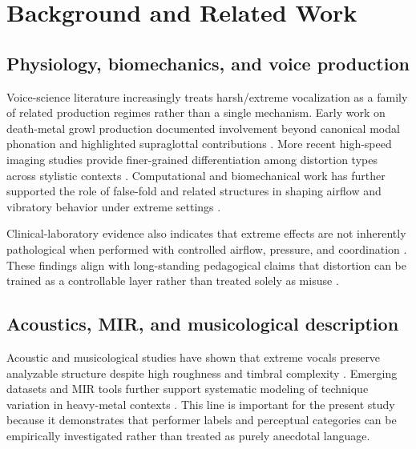 \documentclass{article}
\begin{document}
\section{Background and Related Work}
\subsection{Physiology, biomechanics, and voice production}
Voice-science literature increasingly treats harsh/extreme vocalization as a family of related production regimes rather than a single mechanism.
Early work on death-metal growl production documented involvement beyond canonical modal phonation and highlighted supraglottal contributions \parencite{Eckers2009Growling}.
More recent high-speed imaging studies provide finer-grained differentiation among distortion types across stylistic contexts \parencite{Lee2025VocalDistortion}.
Computational and biomechanical work has further supported the role of false-fold and related structures in shaping airflow and vibratory behavior under extreme settings \parencite{Zheng2009FalseVocalFolds}.

Clinical-laboratory evidence also indicates that extreme effects are not inherently pathological when performed with controlled airflow, pressure, and coordination \parencite{Aaen2024ExtremeVocalEffects,Guzman2018MetalSinging}.
These findings align with long-standing pedagogical claims that distortion can be trained as a controllable layer rather than treated solely as misuse \parencite{sadolin1996rough,sadolin2000complete,sadolin2012effects}.

\subsection{Acoustics, MIR, and musicological description}
Acoustic and musicological studies have shown that extreme vocals preserve analyzable structure despite high roughness and timbral complexity \parencite{Smialek2012Spectrographic,smialek2012musical,Tailleur2021AcousticSpace}.
Emerging datasets and MIR tools further support systematic modeling of technique variation in heavy-metal contexts \parencite{tailleur2024emvddatasetdatasetextreme,Tailleur2024EMVD,Kalbag2022ScreamDetection,McFee2015librosa,Stadler2023VocalTrainML}.
This line is important for the present study because it demonstrates that performer labels and perceptual categories can be empirically investigated rather than treated as purely anecdotal language.
\end{document}
